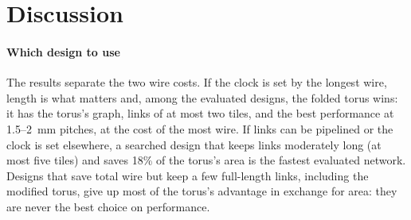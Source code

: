 \documentclass[preprint,12pt,a4paper]{elsarticle}
\begin{document}
\section{Discussion}
\label{sec:discussion}

\paragraph{Which design to use} The results separate the two wire costs.
If the clock is set by the longest wire, length is what matters and,
among the evaluated designs, the folded torus wins: it has the torus's graph, links of at most two tiles,
and the best performance at 1.5--2~mm pitches, at the cost of the most
wire. If links can be pipelined or the clock is set elsewhere, a searched
design that keeps links moderately long (at most five tiles) and saves
18\% of the torus's area is the fastest evaluated network. Designs that save total
wire but keep a few full-length links, including the modified torus, give
up most of the torus's advantage in exchange for area: they are never the
best choice on performance.
\end{document}
